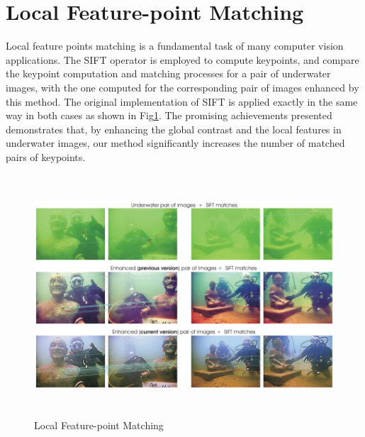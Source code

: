 \documentclass[hidelinks, 12pt]{report}
\begin{document}
\section{Local Feature-point Matching}
Local feature points matching is a fundamental task of many computer vision applications. The SIFT operator is employed to compute keypoints, and compare the keypoint computation and matching processes for a pair of underwater images, with the one computed for the corresponding pair of images enhanced by this method. The original implementation of SIFT is applied exactly in the same way in both cases as shown in Fig\ref{Matching}. The promising achievements presented demonstrates that, by enhancing the global contrast and the local features in underwater images, our method significantly increases the number of matched pairs of keypoints.
\begin{figure}[H]
\centering
\includegraphics[width=15cm,height=9cm]{Feature.png}
\caption[Local Feature-point Matching]{Local Feature-point Matching}
\label{Matching}
\end{figure}
\end{document}
